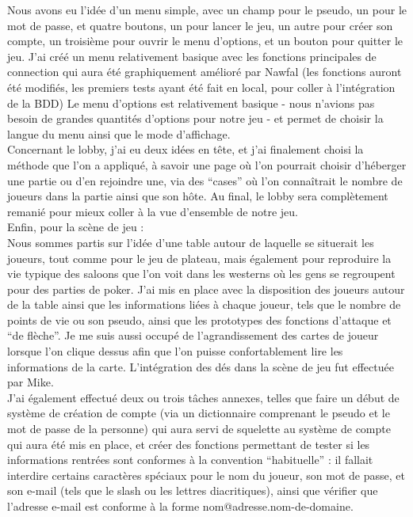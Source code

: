 \documentclass[a4paper,11pt]{article}
\begin{document}
Nous avons eu l’idée d’un menu simple, avec un champ pour le pseudo, un pour le mot de passe, et quatre boutons, un pour lancer le jeu, un autre pour créer son compte, un troisième pour ouvrir le menu d’options, et un bouton pour quitter le jeu. J’ai créé un menu relativement basique avec les fonctions principales de connection qui aura été graphiquement amélioré par Nawfal (les fonctions auront été modifiés, les premiers tests ayant été fait en local, pour coller à l’intégration de la BDD)
Le menu d’options est relativement basique - nous n’avions pas besoin de grandes quantités d’options pour notre jeu - et permet de choisir la langue du menu ainsi que le mode d’affichage. \\
Concernant le lobby, j’ai eu deux idées en tête, et j’ai finalement choisi la méthode que l’on a appliqué, à savoir une page où l’on pourrait choisir d’héberger une partie ou d’en rejoindre une, via des “cases” où l’on connaîtrait le nombre de joueurs dans la partie ainsi que son hôte. Au final, le lobby sera complètement remanié pour mieux coller à la vue d’ensemble de notre jeu. \\

Enfin, pour la scène de jeu : \\

Nous sommes partis sur l’idée d’une table autour de laquelle se situerait les joueurs, tout comme pour le jeu de plateau, mais également pour reproduire la vie typique des saloons que l’on voit dans les westerns où les gens se regroupent pour des parties de poker. J’ai mis en place avec la disposition des joueurs autour de la table ainsi que les informations liées à chaque joueur, tels que le nombre de points de vie ou son pseudo, ainsi que les prototypes des fonctions d’attaque et “de flèche”. Je me suis aussi occupé de l’agrandissement des cartes de joueur lorsque l’on clique dessus afin que l’on puisse confortablement lire les informations de la carte. L’intégration des dés dans la scène de jeu fut effectuée par Mike. \\

J’ai également effectué deux ou trois tâches annexes, telles que faire un début de système de création de compte (via un dictionnaire comprenant le pseudo et le mot de passe de la personne) qui aura servi de squelette au système de compte qui aura été mis en place, et créer des fonctions permettant de tester si les informations rentrées sont conformes à la convention “habituelle” : il fallait interdire certains caractères spéciaux pour le nom du joueur, son mot de passe, et son e-mail (tels que le slash ou les lettres diacritiques), ainsi que vérifier que l’adresse e-mail est conforme à la forme nom@adresse.nom-de-domaine.\\
\end{document}
